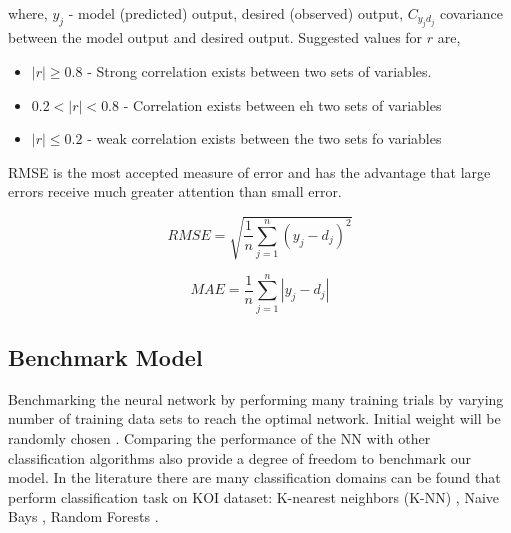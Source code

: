 where, $y_j$ - model (predicted) output, desired (observed) output, $C_{y_{j} d_{j}}$ covariance between the model output and desired output. Suggested values for $r$ are, 

\begin{itemize}
\item $|r| \ge 0.8$ - Strong correlation exists between two sets of variables. 
\item $0.2 < |r| < 0.8 $ - Correlation exists between eh two sets of variables 
\item $|r| \le 0.2$  - weak correlation exists between the two sets fo variables
\end{itemize}

RMSE is the most accepted measure of error and has the advantage that large errors receive much greater attention than small error.

\begin{equation}
RMSE = \sqrt{\frac{1}{n} \sum_{j=1}^{n}(y_j - d_j)^{2}}
\label{sq:rmse}
\end{equation}


\begin{equation}
MAE = \frac{1}{n} \sum_{j=1}^{n}|y_j - d_j|
\label{sq:mae}
\end{equation}

\subsection{Benchmark Model}

Benchmarking the neural network by performing many training trials by varying number of training data sets to reach the optimal network. Initial weight will be randomly chosen \cite{hamey1991benchmarking}. Comparing the performance of the NN with other classification algorithms also provide a degree of freedom to benchmark our model. In the literature there are many classification domains can be found that perform classification task on KOI dataset: K-nearest neighbors (K-NN) \cite{2011MNRAS.414.2602D}, Naive Bays \cite{feigelson2012}, Random Forests \cite{2015ApJ...806....6M}.


